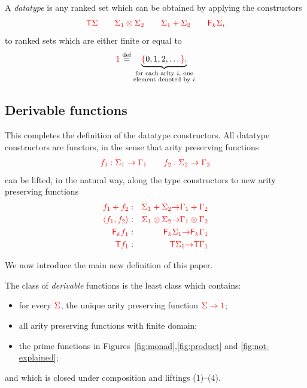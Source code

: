 \begin{definition}[Datatypes] \label{def:types} A \emph{datatype} is any ranked set which can be obtained by applying the constructors 
    \begin{align*}
    {\color{red}{{\color{red}{\mathsf T}}{\color{red}{\Sigma}}\qquad {\color{red}{\Sigma}}_1 \otimes {\color{red}{\Sigma}}_2 \qquad {\color{red}{\Sigma}}_1 + {\color{red}{\Sigma}}_2 \qquad {\color{red}{\mathsf F_{k}}}{\color{red}{\Sigma}}}},
    \end{align*}
    to ranked sets which are either finite or equal to 
    \begin{align*}
    {\color{red}{1}} \stackrel{\text{def}}=  \underbrace{{\color{red}{\{}}0, 1, 2,\ldots {\color{red}{\}}}.}_{\substack{\text{for each arity $i$, one} \\ \text{element denoted by $i$}}}
    \end{align*}
\end{definition}

\subsection{Derivable functions}
\smallskip
\newcommand{\funcitem}[3]{\ranked{#1  } &:& \ranked{#2} \rto  \ranked{#3}}
This completes the definition of the datatype constructors. 
All datatype constructors are functors, in the sense  that  arity preserving functions
\begin{align*}
{\color{red}{f_1 : \Sigma_1 \to \Gamma_1 \qquad f_2 : \Sigma_2 \to \Gamma_2}}
\end{align*}       
can be lifted, in the natural way, along the type constructors to new arity preserving  functions
\begin{eqnarray}
\label{eq:liftplus}\funcitem{f_1 + f_2}{\Sigma_1 + \Sigma_2}{\Gamma_1 + \Gamma_2} \\
\funcitem{\tensorpair{f_1,f_2}}{\Sigma_1 \otimes \Sigma_2}{\Gamma_1 \otimes \Gamma_2}\\
\funcitem{\reduce k f_1}{\reduce k \Sigma_1}{\reduce k \Gamma_1}\\
\label{eq:liftterm}
\funcitem{\tmonad f_1}{\tmonad \Sigma_1}{\tmonad \Gamma_1}
\end{eqnarray}

We now introduce the main new definition of this paper.

\begin{definition}
    The class of \emph{derivable} functions is the least class which contains:
    \begin{itemize}
    \item for every ${\color{red}{\Sigma}}$, the unique arity preserving function ${\color{red}{\Sigma \to {\color{red}{1}}}}$;
    \item  all arity preserving functions with finite domain;
        \item  the prime functions in Figures~\ref{fig:monad},\ref{fig:product} and \ref{fig:not-explained};
         \end{itemize}
and which is closed under composition and  liftings (1)--(4).
\end{definition}


